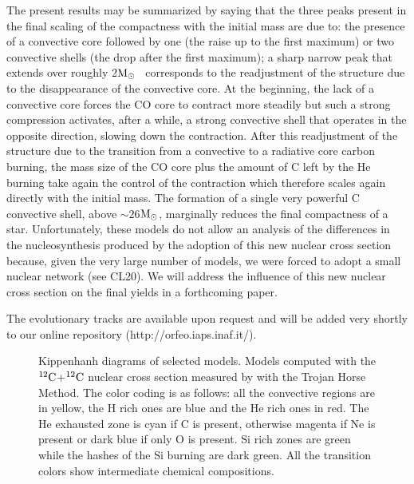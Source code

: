 \documentclass{aastex631}
\newcommand{\msun}{$\rm M_\odot$}
\newcommand\nuk[2]{$\rm ^{\rm #2} #1$}
\begin{document}
The present results may be summarized by saying that the three peaks present in the final scaling of the compactness with the initial mass are due to: the presence of a convective core followed by one (the raise up to the first maximum) or two convective shells (the drop after the first maximum); a sharp narrow peak that extends over roughly 2\msun~ corresponds to the readjustment of the structure due to the disappearance of the convective core. At the beginning, the lack of a convective core forces the CO core to contract more steadily but such a strong compression activates, after a while, a strong convective shell that operates in the opposite direction, slowing down the contraction. After this readjustment of the structure due to the transition from a convective to a radiative core carbon burning, the mass size of the CO core plus the amount of C left by the He burning take again the control of the contraction which therefore scales again directly with the initial mass. The formation of a single very powerful C convective shell, above $\sim26$\msun, marginally reduces the final compactness of a star.
Unfortunately, these models do not allow an analysis of the differences in the nucleosynthesis produced by the adoption of this new nuclear cross section because, given the very large number of models, we were forced to adopt a small nuclear network (see CL20). We will address the influence of this new nuclear cross section on the final yields in a forthcoming paper. 

The evolutionary tracks are available upon request and will be added very shortly to our online repository (http://orfeo.iaps.inaf.it/).



\begin{figure}[ht!]
\caption{Kippenhanh diagrams of selected models. Models computed with the \nuk{C}{12}+\nuk{C}{12} nuclear cross section measured by \cite{thm18} with the Trojan Horse Method. The color coding is as follows: all the convective regions are in yellow, the H rich ones are blue and the He rich ones in red. The He exhausted zone is cyan if C is present, otherwise magenta if Ne is present or dark blue if only O is present. Si rich zones are green while the hashes of the Si burning are dark green. All the transition colors show intermediate chemical compositions.\label{fig:kipp1}}
\end{figure}
\end{document}
